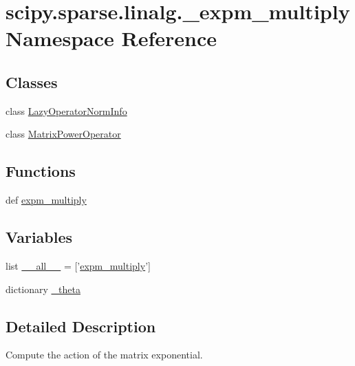 \hypertarget{namespacescipy_1_1sparse_1_1linalg_1_1__expm__multiply}{}\section{scipy.\+sparse.\+linalg.\+\_\+expm\+\_\+multiply Namespace Reference}
\label{namespacescipy_1_1sparse_1_1linalg_1_1__expm__multiply}
\subsection*{Classes}
\begin{DoxyCompactItemize}
\item 
class \hyperlink{classscipy_1_1sparse_1_1linalg_1_1__expm__multiply_1_1LazyOperatorNormInfo}{Lazy\+Operator\+Norm\+Info}
\item 
class \hyperlink{classscipy_1_1sparse_1_1linalg_1_1__expm__multiply_1_1MatrixPowerOperator}{Matrix\+Power\+Operator}
\end{DoxyCompactItemize}
\subsection*{Functions}
\begin{DoxyCompactItemize}
\item 
def \hyperlink{namespacescipy_1_1sparse_1_1linalg_1_1__expm__multiply_a2d1ab991a6460f4014b7beedd39629d5}{expm\+\_\+multiply}
\end{DoxyCompactItemize}
\subsection*{Variables}
\begin{DoxyCompactItemize}
\item 
list \hyperlink{namespacescipy_1_1sparse_1_1linalg_1_1__expm__multiply_a8e3a3e9b4bc49291b5005df471e1ca61}{\+\_\+\+\_\+all\+\_\+\+\_\+} = \mbox{[}'\hyperlink{namespacescipy_1_1sparse_1_1linalg_1_1__expm__multiply_a2d1ab991a6460f4014b7beedd39629d5}{expm\+\_\+multiply}'\mbox{]}
\item 
dictionary \hyperlink{namespacescipy_1_1sparse_1_1linalg_1_1__expm__multiply_a725e8a909fe0ab2f58f6a5a71bdc6f0e}{\+\_\+theta}
\end{DoxyCompactItemize}


\subsection{Detailed Description}
\begin{DoxyVerb}Compute the action of the matrix exponential.
\end{DoxyVerb}
 

